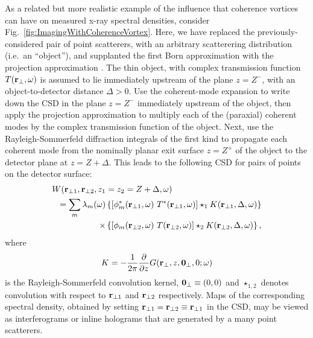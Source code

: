 \documentclass[%
 reprint,
 amsmath,amssymb,
 aps,
]{revtex4-1}
\begin{document}
As a related but more realistic example of the  influence that coherence vortices can have on measured x-ray spectral densities, consider {Fig.~\ref{fig:ImagingWithCoherenceVortex}}.  Here, we have replaced the previously-considered pair of point scatterers, with an arbitrary scatterering distribution (i.e.~an ``object''), and supplanted the first Born approximation with the projection approximation \cite{paganin_book}.  The thin object, with complex transmission function $T({\bf r}_{\perp},\omega)$ is assumed to lie immediately upstream of the plane $z=Z^-$, with an object-to-detector distance $\Delta > 0$.  Use the coherent-mode expansion to write down the CSD in the plane $z=Z^-$ immediately upstream of the object, then apply the projection approximation to multiply each of the (paraxial) coherent modes by the complex transmission function of the object.  Next, use the Rayleigh-Sommerfeld diffraction integrals of the first kind \cite{Rayleigh, Sommerfeld, mandel_wolf} to propagate each coherent mode from the nominally planar exit surface $z=Z^+$ of the object to the detector plane at $z=Z+\Delta$.  This leads to the following CSD for pairs of points on the detector surface:     
\begin{equation}
\begin{aligned}
\label{eq:CSD_with_object_and_detector}
W ({\bf r}_{\perp 1}, {\bf r}_{\perp 2},z_1 &=z_2=Z+\Delta,\omega) \\ =\sum_m \lambda_m({\omega}) & \left\{ [\phi_m^*({\bf r}_{\perp 1},\omega)~T^*({\bf r}_{\perp 1},\omega)]\star_1 K({\bf r}_{\perp 1},\Delta,\omega)\right\} \\ \times & \left\{ [\phi_m({\bf r}_{\perp 2},\omega)~T({\bf r}_{\perp 2},\omega)]\star_2 K({\bf r}_{\perp 2},\Delta,\omega)\right\},
\end{aligned}
\end{equation}
where 
\begin{equation}
K=-\frac{1}{2\pi} \frac{\partial}{\partial z} G({\bf r}_{\perp},z,{\bf 0}_{\perp},0;\omega) 
\end{equation}
is the Rayleigh-Sommerfeld convolution kernel, ${\bf 0}_{\perp}\equiv (0,0)$ and $\star_{1,2}$ denotes convolution with respect to ${\bf r}_{\perp 1}$ and ${\bf r}_{\perp 2}$ respectively.  Maps of the corresponding spectral density, obtained by setting ${\bf r}_{\perp 1}={\bf r}_{\perp 2}\equiv{\bf r}_{\perp 1}$ in the CSD, may be viewed as interferograms or inline holograms that are generated by a many point scatterers.   
\end{document}
